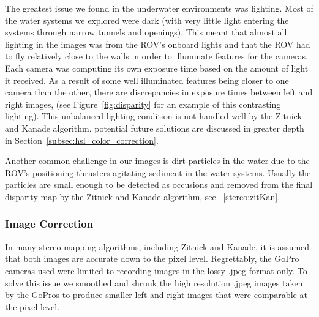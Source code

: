 \documentclass[a4paper,twoside]{article}
\begin{document}
The greatest issue we found in the underwater environments was lighting.  Most of the water systems we explored were dark (with very little light entering the systems through narrow tunnels and openings).  This meant that almost all lighting in the images was from the ROV's onboard lights and that the ROV had to fly relatively close to the walls in order to illuminate features for the cameras.
Each camera was computing its own exposure time based on the amount of light it received.  
As a result of some well illuminated features being closer to one camera than the other, there are discrepancies in exposure times between left and right images, (see Figure~\ref{fig:disparity} for an example of this contrasting lighting).
  This unbalanced lighting condition is not handled well by the Zitnick and Kanade algorithm, potential future solutions are discussed in greater depth in Section~\ref{subsec:hsl_color_correction}.

Another common challenge in our images is dirt particles in the water due to the ROV's positioning thrusters agitating sediment in the water systems. Usually the particles are small enough to be detected as occusions and removed from the final disparity map by the Zitnick and Kanade algorithm, see ~\ref{stereo:zitKan}.

\subsubsection{Image Correction}
\label{subsec:image_correction}

In many stereo mapping algorithms, including Zitnick and Kanade, it is assumed that both images are accurate down to the pixel level.
Regrettably, the GoPro cameras used were limited to recording images in the lossy .jpeg format only.
To solve this issue we smoothed and shrunk the high resolution .jpeg images taken by the GoPros to produce smaller left and right images that were comparable at the pixel level.
\end{document}
